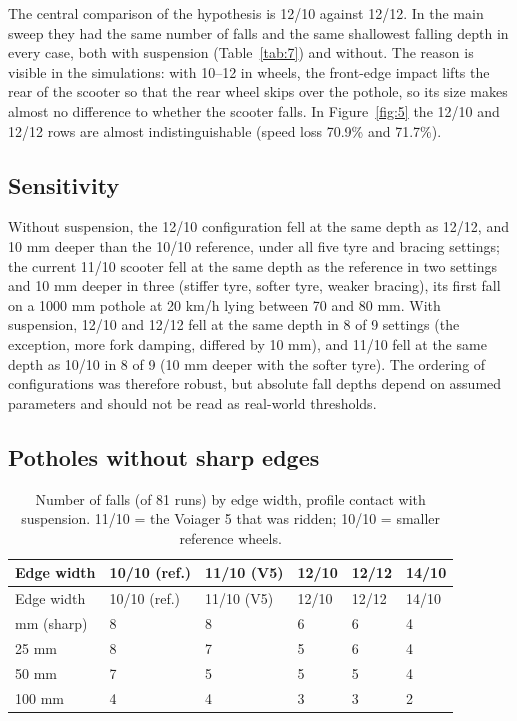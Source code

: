 The central comparison of the hypothesis is 12/10 against 12/12. In the main sweep they
had the same number of falls and the same shallowest falling depth in every case, both
with suspension (Table~\ref{tab:7}) and without. The reason is visible in the simulations: with
10--12 in wheels, the front-edge impact lifts the rear of the scooter so that the rear
wheel skips over the pothole, so its size makes almost no difference to whether the
scooter falls. In Figure~\ref{fig:5} the 12/10 and 12/12 rows are almost indistinguishable (speed
loss 70.9\% and 71.7\%).

\subsection{Sensitivity}\label{sensitivity}


Without suspension, the 12/10 configuration fell at the same depth as 12/12, and 10 mm
deeper than the 10/10 reference, under all five tyre and bracing settings; the current
11/10 scooter fell at the same depth as the reference in two settings and 10 mm deeper in
three (stiffer tyre, softer tyre, weaker bracing), its first fall on a 1000 mm pothole at
20 km/h lying between 70 and 80 mm. With suspension, 12/10 and 12/12 fell at the same
depth in 8 of 9 settings (the exception, more fork damping, differed by 10 mm), and 11/10
fell at the same depth as 10/10 in 8 of 9 (10 mm deeper with the softer tyre). The ordering of configurations was
therefore robust, but absolute fall depths depend on assumed parameters and should not be
read as real-world thresholds.

\subsection{Potholes without sharp edges}\label{potholes-without-sharp-edges}


\begin{longtable}[]{@{}llllll@{}}
\caption{Number of falls (of 81 runs) by edge width, profile contact with suspension. 11/10 = the Voiager 5 that was ridden; 10/10 = smaller reference wheels.}\label{tab:8}\tabularnewline
\toprule\noalign{}
Edge width & 10/10 (ref.) & 11/10 (V5) & 12/10 & 12/12 & 14/10 \\
\midrule\noalign{}
\endfirsthead
\toprule\noalign{}
Edge width & 10/10 (ref.) & 11/10 (V5) & 12/10 & 12/12 & 14/10 \\
\midrule\noalign{}
\endhead
\bottomrule\noalign{}
\endlastfoot
0 mm (sharp) & 8 & 8 & 6 & 6 & 4 \\
25 mm & 8 & 7 & 5 & 6 & 4 \\
50 mm & 7 & 5 & 5 & 5 & 4 \\
100 mm & 4 & 4 & 3 & 3 & 2 \\
\end{longtable}

